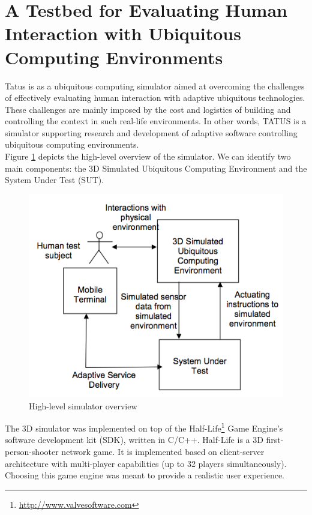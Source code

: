 \section{A Testbed for Evaluating Human Interaction with Ubiquitous Computing Environments}\label{sec:tatus}

Tatus \cite{o2005testbed} is as a ubiquitous computing simulator aimed at overcoming the challenges of effectively evaluating human interaction with adaptive ubiquitous technologies. These challenges are mainly imposed by the cost and logistics of building and controlling the context in such real-life environments. In other words, TATUS is a simulator supporting research and development of adaptive software controlling ubiquitous computing environments.\\

Figure \ref{fig:tatus_overview} depicts the high-level overview of the simulator. We can identify two main components: the 3D Simulated Ubiquitous Computing Environment and the System Under Test (SUT).\\

\begin{figure}[H]
	\centering
	\includegraphics[width=\linewidth]{gfx/Chapter2/tatus_system_overview}
	\caption{High-level simulator overview}
	\label{fig:tatus_overview}
\end{figure}

The 3D simulator was implemented on top of the Half-Life\footnote{\url{http://www.valvesoftware.com}} Game Engine's software development kit (SDK), written in C/C++. Half-Life is a 3D first-person-shooter network game. It is implemented based on client-server architecture with multi-player capabilities (up to 32 players simultaneously). Choosing this game engine was meant to provide a realistic user experience.\\

